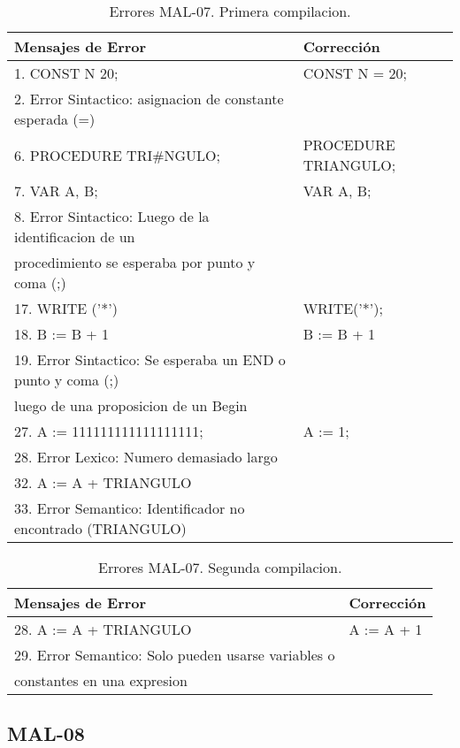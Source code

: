 \documentclass[a4paper,12pt]{article}
\begin{document}
\begin{table}[H]
\centering
\begin{tabular}{|l|l|}
\hline
Mensajes de Error & Corrección\\
\hline
1. CONST N 20;												&CONST N = 20;\\
2. Error Sintactico: asignacion de constante esperada (=)		&\\
\hline
6. PROCEDURE TRI\#NGULO;										&PROCEDURE TRIANGULO;\\
7. VAR A, B;													&VAR A, B;\\
8. Error Sintactico: Luego de la identificacion de un 		&\\
procedimiento se esperaba por punto y coma (;)				&\\
\hline
17. WRITE ('*')												& WRITE('*');\\
18. B := B + 1												& B := B + 1\\
19. Error Sintactico: Se esperaba un END o punto y coma (;) 	&\\
luego de una proposicion de un Begin							&\\
\hline
27. A := 111111111111111111;									&A := 1;\\
28. Error Lexico: Numero demasiado largo						&\\
\hline
32. A := A + TRIANGULO										&\\
33. Error Semantico: Identificador no encontrado (TRIANGULO)	&\\
\hline
\end{tabular}
\caption{Errores MAL-07. Primera compilacion.}
\label{MAL-07-1}
\end{table}

\begin{table}[H]
\centering
\begin{tabular}{|l|l|}
\hline
Mensajes de Error & Corrección\\
\hline
28. A := A + TRIANGULO										&A := A + 1\\
29. Error Semantico: Solo pueden usarse variables o 			&\\
constantes en una expresion									&\\
\hline
\end{tabular}
\caption{Errores MAL-07. Segunda compilacion.}
\label{MAL-05-2}
\end{table}


\subsection{MAL-08}
\end{document}
